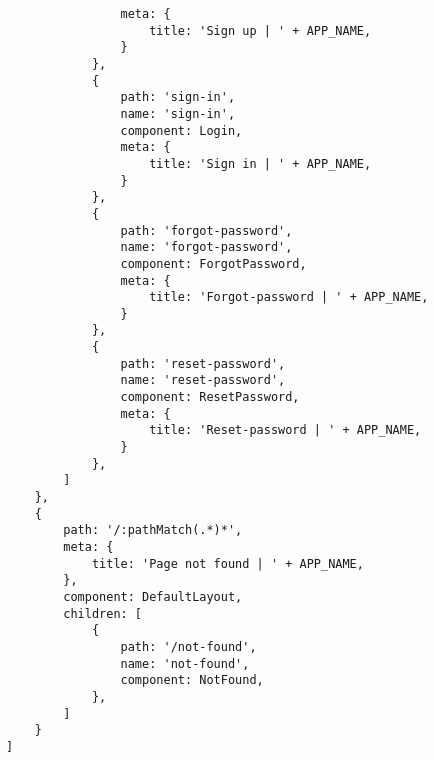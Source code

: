 \begin{lstlisting}
				meta: {
					title: 'Sign up | ' + APP_NAME,
				}
			},
			{
				path: 'sign-in',
				name: 'sign-in',
				component: Login,
				meta: {
					title: 'Sign in | ' + APP_NAME,
				}
			},
			{
				path: 'forgot-password',
				name: 'forgot-password',
				component: ForgotPassword,
				meta: {
					title: 'Forgot-password | ' + APP_NAME,
				}
			},
			{
				path: 'reset-password',
				name: 'reset-password',
				component: ResetPassword,
				meta: {
					title: 'Reset-password | ' + APP_NAME,
				}
			},
		]
	},
	{	
		path: '/:pathMatch(.*)*',
		meta: {
			title: 'Page not found | ' + APP_NAME,
		},
		component: DefaultLayout,
		children: [
			{
				path: '/not-found',
				name: 'not-found',
				component: NotFound,
			},
		]
	}
]
\end{lstlisting}